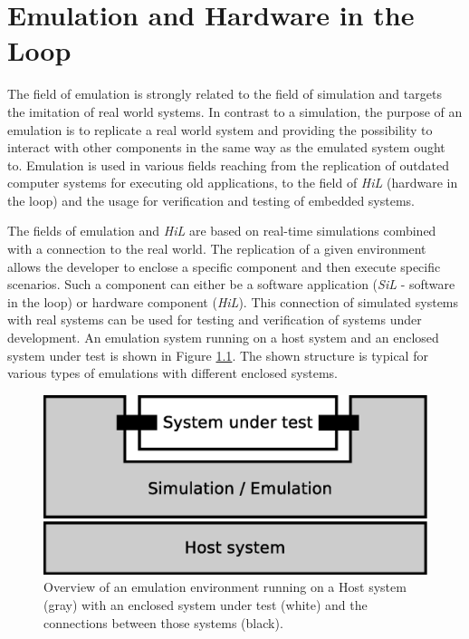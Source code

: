 \chapter{Emulation and Hardware in the Loop}
\label{cha:emulation}

The field of emulation is strongly related to the field of simulation and targets the imitation of real world systems.
In contrast to a simulation, the purpose of an emulation is to replicate a real world system and providing the possibility to interact with other components in the same way as the emulated system ought to.
Emulation is used in various fields reaching from the replication of outdated computer systems for executing old applications, to the field of \emph{HiL} (hardware in the loop) and the usage for verification and testing of embedded systems. \cite{emulation_koninklijke}

The fields of emulation and \emph{HiL} are based on real-time simulations combined with a connection to the real world.
The replication of a given environment allows the developer to enclose a specific component and then execute specific scenarios.
Such a component can either be a software application (\emph{SiL} - software in the loop) or hardware component (\emph{HiL}).
This connection of simulated systems with real systems can be used for testing and verification of systems under development.
An emulation system running on a host system and an enclosed system under test is shown in Figure \ref{fig:emulation_overview}.
The shown structure is typical for various types of emulations with different enclosed systems.

\begin{figure}
\centering
\includegraphics[width=0.7\linewidth]{images/emulation_overview}
\caption{Overview of an emulation environment running on a Host system (gray) with an enclosed system under test (white) and the connections between those systems (black).}
\label{fig:emulation_overview}
\end{figure}



